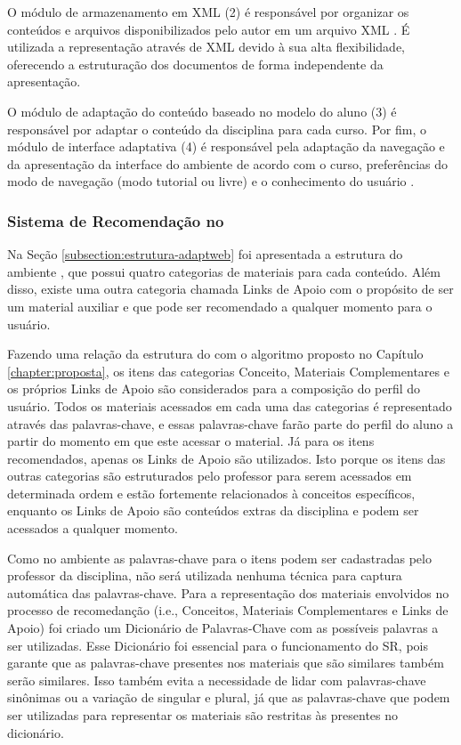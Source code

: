 O módulo de armazenamento em XML (2) é responsável por organizar os conteúdos e arquivos disponibilizados pelo autor em
um arquivo XML \cite{gasparini2003interface}. É utilizada a representação através de XML devido à sua alta
flexibilidade, oferecendo a estruturação dos documentos de forma independente da apresentação.

O módulo de adaptação do conteúdo baseado no modelo do aluno (3) é responsável por adaptar o conteúdo da disciplina
para cada curso. Por fim, o módulo de interface adaptativa (4) é responsável pela adaptação da navegação e da
apresentação da interface do ambiente de acordo com o curso, preferências do modo de navegação (modo tutorial ou livre)
e o conhecimento do usuário \cite{gasparini2003interface}.

\subsubsection{Sistema de Recomendação no \adaptweb}

Na Seção \ref{subsection:estrutura-adaptweb} foi apresentada a estrutura do ambiente \adaptweb, que possui quatro categorias
de materiais para cada conteúdo. Além disso, existe uma outra categoria chamada Links de Apoio com o propósito de ser um
material auxiliar e que pode ser recomendado a qualquer momento para o usuário.

Fazendo uma relação da estrutura do \adaptwebspace com o algoritmo proposto no Capítulo \ref{chapter:proposta}, os itens
das categorias Conceito, Materiais Complementares e os próprios Links de Apoio são considerados para a composição do
perfil do usuário. Todos os materiais acessados em cada uma das categorias é representado através das palavras-chave, e
essas palavras-chave farão parte do perfil do aluno a partir do momento em que este acessar o material. Já para os itens
recomendados, apenas os Links de Apoio são utilizados. Isto porque os itens das outras categorias são estruturados pelo professor para serem acessados em determinada
ordem e estão fortemente relacionados à conceitos específicos, enquanto os Links de Apoio são conteúdos extras da disciplina
e podem ser acessados a qualquer momento.

Como no ambiente \adaptwebspace as palavras-chave para o itens podem ser cadastradas pelo professor da disciplina, não será
utilizada nenhuma técnica para captura automática das palavras-chave. Para a representação dos materiais envolvidos no
processo de recomedanção (i.e., Conceitos, Materiais Complementares e Links de Apoio) foi criado um Dicionário de Palavras-Chave
com as possíveis palavras a ser utilizadas. Esse Dicionário foi essencial para o funcionamento do SR, pois garante que as
palavras-chave presentes nos materiais que são similares também serão similares. Isso também evita a necessidade de lidar
com palavras-chave sinônimas ou a variação de singular e plural, já que as palavras-chave que podem ser utilizadas para
representar os materiais são restritas às presentes no dicionário.

